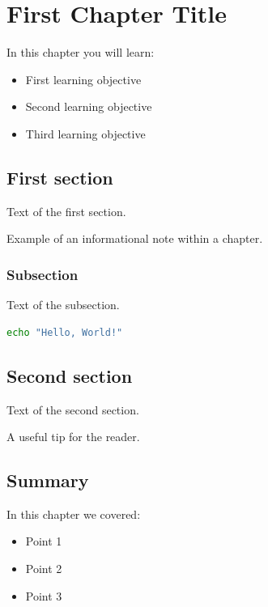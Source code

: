 
\chapter{First Chapter Title}
\label{ch:chapter-01}


In this chapter you will learn:
\begin{itemize}
  \item First learning objective
  \item Second learning objective
  \item Third learning objective
\end{itemize}

\section{First section}
\label{sec:01-section-1}

Text of the first section.

\begin{notebox}
Example of an informational note within a chapter.
\end{notebox}

\subsection{Subsection}

Text of the subsection.

\begin{lstlisting}[language=bash,caption={Example command}]
echo "Hello, World!"
\end{lstlisting}

\section{Second section}
\label{sec:01-section-2}

Text of the second section.

\begin{tipbox}
A useful tip for the reader.
\end{tipbox}

\section{Summary}

In this chapter we covered:
\begin{itemize}
  \item Point 1
  \item Point 2
  \item Point 3
\end{itemize}
